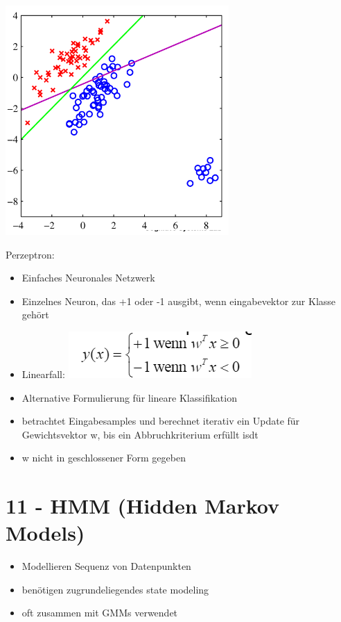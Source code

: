 \documentclass[a4paper,10pt,oneside]{article}
\begin{document}
\begin{itemize}
\includegraphics[scale=0.65]{Grafiken/falschetrennlinie.png}
	
\end{itemize}

Perzeptron:
\begin{itemize}
	\item Einfaches Neuronales Netzwerk
	\item Einzelnes Neuron, das +1 oder -1 ausgibt, wenn eingabevektor zur Klasse gehört
	\item Linearfall:
	\includegraphics[scale=0.65]{Grafiken/perzeptron1.png}
	\item Alternative Formulierung für lineare Klassifikation
	\item betrachtet Eingabesamples und berechnet iterativ ein Update für Gewichtsvektor w, bis ein Abbruchkriterium erfüllt isdt
	\item w nicht in geschlossener Form gegeben
\end{itemize}



\section{11 - HMM (Hidden Markov Models)}
	\begin{itemize}
		\item Modellieren Sequenz von Datenpunkten
		\item benötigen zugrundeliegendes state modeling
		\item oft zusammen mit GMMs verwendet
	\end{itemize}
	
\end{document}
